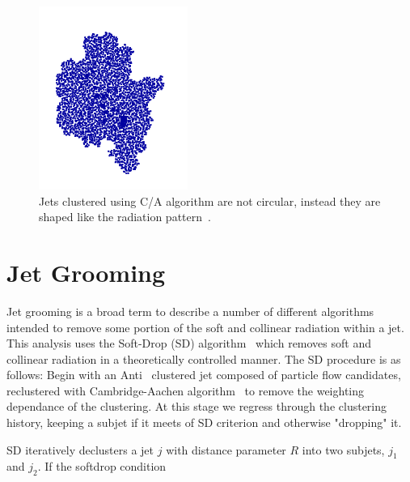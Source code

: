 \begin{figure}[htb]
\centering
\includegraphics[width=.40\textwidth]{visuals/figs_subjet-plots-CA.png}
\caption{Jets clustered using C/A algorithm are not circular, instead they are shaped like the radiation pattern~\cite{Dreyer:2018nbf}.}
\label{fig:cashape}
\end{figure}














\section{Jet Grooming}\label{sec:jetgroom}

Jet grooming is a broad term to describe a number of different algorithms intended to remove some portion of the soft and collinear radiation within a jet. This analysis uses the Soft-Drop (SD) algorithm~\cite{softdrop} which removes soft and collinear radiation in a theoretically controlled manner. The SD procedure is as follows: Begin with an Anti\kt ~\cite{Cacciari:2008gp} clustered jet composed of particle flow candidates, reclustered with Cambridge-Aachen algorithm~\cite{Dokshitzer:1997in} to remove the \pt weighting dependance of the clustering. At this stage we regress through the clustering history, keeping a subjet if it meets of SD criterion and otherwise "dropping" it.


SD iteratively declusters a jet $j$ with distance parameter $R$ into two subjets, $j_1$ and $j_2$.
If the softdrop condition

